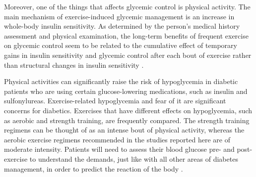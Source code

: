Moreover, one of the things that affects glycemic control is physical activity.
The main mechanism of exercise-induced glycemic management is an increase in
whole-body insulin sensitivity. As determined by the person's medical history
assessment and physical examination, the long-term benefits of frequent exercise
on glycemic control seem to be related to the cumulative effect of temporary
gains in insulin sensitivity and glycemic control after each bout of exercise
rather than structural changes in insulin sensitivity \parencite{shiferaw-2022}.

Physical activities can significantly raise the risk of hypoglycemia in diabetic
patients who are using certain glucose-lowering medications, such as insulin and
sulfonylureas. Exercise-related hypoglycemia and fear of it are significant
concerns for diabetics. Exercises that have different effects on hypoglycemia,
such as aerobic and strength training, are frequently compared. The strength
training regimens can be thought of as an intense bout of physical activity,
whereas the aerobic exercise regimens recommended in the studies reported here
are of moderate intensity. Patients will need to assess their blood glucose pre-
and post-exercise to understand the demands, just like with all other areas of
diabetes management, in order to predict the reaction of the body \parencite{zahalka-2023}.
